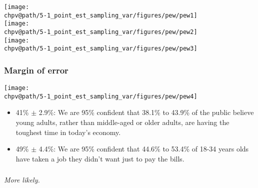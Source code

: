 \documentclass[t,compress,mathserif]{beamer}
\makeatletter
\newcommand{\soln}[1]{\textit{#1}}
\def\chpv@path{../../Chp 5}
\makeatother
\begin{document}
\begin{frame}
    \frametitle{}
    
    \begin{center}
    \texttt{[image: \\chpv@path/5-1\_point\_est\_sampling\_var/figures/pew/pew1]} \\
    \texttt{[image: \\chpv@path/5-1\_point\_est\_sampling\_var/figures/pew/pew2]} \\
    \texttt{[image: \\chpv@path/5-1\_point\_est\_sampling\_var/figures/pew/pew3]}
    \end{center}
    
    
\end{frame}


\begin{frame}
    \frametitle{Margin of error}
    
    \begin{center}
    \texttt{[image: \\chpv@path/5-1\_point\_est\_sampling\_var/figures/pew/pew4]}
    \end{center}
    
    \begin{itemize}
    
    \item 41\% $\pm$ 2.9\%: We are 95\% confident that 38.1\% to 43.9\% of the public believe young adults, rather than middle-aged or older adults, are having the toughest time in today's economy.
    
    \item 49\% $\pm$ 4.4\%: We are 95\% confident that 44.6\% to 53.4\% of 18-34 years olds have taken a job they didn't want just to pay the bills.
    
    \end{itemize}
    
\end{frame}


\begin{frame}
    \frametitle{}
    
    
    \pause
    
    \soln{More likely.}
    
\end{frame}
\end{document}
